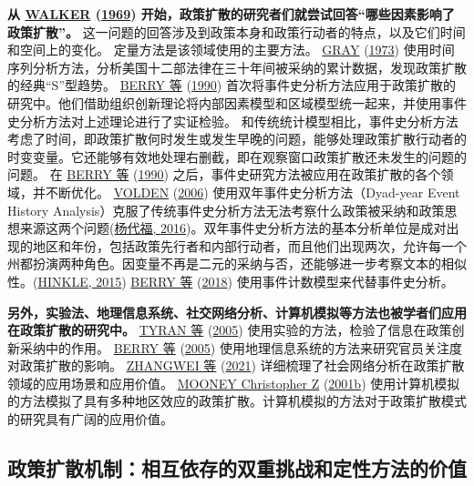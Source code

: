\documentclass[
  12pt,
]{ctexart}
\begin{document}
\textbf{从 \protect\hyperlink{ref-Walker1969}{WALKER} (\protect\hyperlink{ref-Walker1969}{1969}) 开始，政策扩散的研究者们就尝试回答``哪些因素影响了政策扩散''。}
这一问题的回答涉及到政策本身和政策行动者的特点，以及它们时间和空间上的变化。
定量方法是该领域使用的主要方法。
\protect\hyperlink{ref-Gray1973}{GRAY} (\protect\hyperlink{ref-Gray1973}{1973}) 使用时间序列分析方法，分析美国十二部法律在三十年间被采纳的累计数据，发现政策扩散的经典``S''型趋势。
\protect\hyperlink{ref-BerryBerry1990}{BERRY 等} (\protect\hyperlink{ref-BerryBerry1990}{1990}) 首次将事件史分析方法应用于政策扩散的研究中。他们借助组织创新理论将内部因素模型和区域模型统一起来，并使用事件史分析方法对上述理论进行了实证检验。
和传统统计模型相比，事件史分析方法考虑了时间，即政策扩散何时发生或发生早晚的问题，能够处理政策扩散行动者的时变变量。它还能够有效地处理右删截，即在观察窗口政策扩散还未发生的问题的问题。
在 \protect\hyperlink{ref-BerryBerry1990}{BERRY 等} (\protect\hyperlink{ref-BerryBerry1990}{1990}) 之后，事件史研究方法被应用在政策扩散的各个领域，并不断优化。
\protect\hyperlink{ref-Volden2006}{VOLDEN} (\protect\hyperlink{ref-Volden2006}{2006}) 使用双年事件史分析方法（Dyad-year Event History Analysis）克服了传统事件史分析方法无法考察什么政策被采纳和政策思想来源这两个问题(\protect\hyperlink{ref-YangDaiFu2016}{杨代福, 2016})。双年事件史分析方法的基本分析单位是成对出现的地区和年份，包括政策先行者和内部行动者，而且他们出现两次，允许每一个州都扮演两种角色。因变量不再是二元的采纳与否，还能够进一步考察文本的相似性。(\protect\hyperlink{ref-Hinkle2015}{HINKLE, 2015})
\protect\hyperlink{ref-BerryBerry2018}{BERRY 等} (\protect\hyperlink{ref-BerryBerry2018}{2018}) 使用事件计数模型来代替事件史分析。

\textbf{另外，实验法、地理信息系统、社交网络分析、计算机模拟等方法也被学者们应用在政策扩散的研究中。}
\protect\hyperlink{ref-TyranSausgruber2005}{TYRAN 等} (\protect\hyperlink{ref-TyranSausgruber2005}{2005}) 使用实验的方法，检验了信息在政策创新采纳中的作用。
\protect\hyperlink{ref-BerryBaybeck2005}{BERRY 等} (\protect\hyperlink{ref-BerryBaybeck2005}{2005}) 使用地理信息系统的方法来研究官员关注度对政策扩散的影响。
\protect\hyperlink{ref-ZhangWeiEtAl2021}{ZHANGWEI 等} (\protect\hyperlink{ref-ZhangWeiEtAl2021}{2021}) 详细梳理了社会网络分析在政策扩散领域的应用场景和应用价值。
\protect\hyperlink{ref-Mooney2001a}{MOONEY Christopher Z} (\protect\hyperlink{ref-Mooney2001a}{2001b}) 使用计算机模拟的方法模拟了具有多种地区效应的政策扩散。计算机模拟的方法对于政策扩散模式的研究具有广阔的应用价值。

\hypertarget{ux653fux7b56ux6269ux6563ux673aux5236ux76f8ux4e92ux4f9dux5b58ux7684ux53ccux91cdux6311ux6218ux548cux5b9aux6027ux65b9ux6cd5ux7684ux4ef7ux503c}{%
\subsection{政策扩散机制：相互依存的双重挑战和定性方法的价值}\label{ux653fux7b56ux6269ux6563ux673aux5236ux76f8ux4e92ux4f9dux5b58ux7684ux53ccux91cdux6311ux6218ux548cux5b9aux6027ux65b9ux6cd5ux7684ux4ef7ux503c}}
\end{document}
